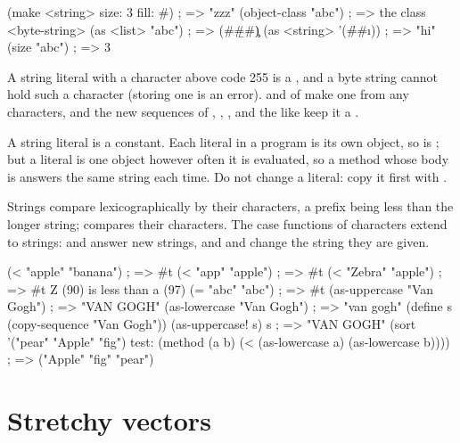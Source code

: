 \begin{dylan}
(make <string> size: 3 fill: #\z)   ; => "zzz"
(object-class "abc")                ; => {the class <byte-string>}
(as <list> "abc")                   ; => (#\a #\b #\c)
(as <string> '(#\h #\i))            ; => "hi"
(size "abc")                        ; => 3
\end{dylan}

\noindent A string literal with a character above code 255 is a
, and a byte string cannot hold such a character
(storing one is an error).  and  of
 make one from any characters, and the new
sequences of , , ,
 and the like keep it a .

\begin{warnbox}
A string literal is a constant. Each literal in a program is its own
object, so  is ; but a literal is one
object however often it is evaluated, so a method whose body is
 answers the same string each time. Do not change a literal:
copy it first with .
\end{warnbox}

Strings compare lexicographically by their characters, a prefix being
less than the longer string; \code{=} compares their characters. The
case functions of characters extend to strings:  and
 answer new strings, and  and
 change the string they are given.

\begin{dylan}
(< "apple" "banana")       ; => #t
(< "app" "apple")          ; => #t
(< "Zebra" "apple")        ; => #t      Z (90) is less than a (97)
(= "abc" "abc")            ; => #t
(as-uppercase "Van Gogh")  ; => "VAN GOGH"
(as-lowercase "Van Gogh")  ; => "van gogh"
(define s (copy-sequence "Van Gogh"))
(as-uppercase! s)
s                          ; => "VAN GOGH"
(sort '("pear" "Apple" "fig")
      test: (method (a b) (< (as-lowercase a) (as-lowercase b))))
; => ("Apple" "fig" "pear")
\end{dylan}

\section{Stretchy vectors}\label{sec:collections-stretchy}

